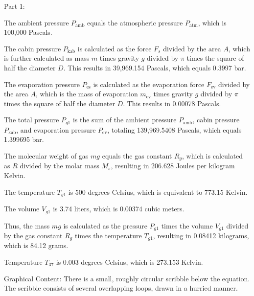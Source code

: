 Part 1:

The ambient pressure \( P_{\text{amb}} \) equals the atmospheric pressure \( P_{\text{atm}} \), which is 100,000 Pascals.

The cabin pressure \( P_{\text{kab}} \) is calculated as the force \( F_s \) divided by the area \( A \), which is further calculated as mass \( m \) times gravity \( g \) divided by \( \pi \) times the square of half the diameter \( D \). This results in 39,969.154 Pascals, which equals 0.3997 bar.

The evaporation pressure \( P_{\text{es}} \) is calculated as the evaporation force \( F_{\text{ev}} \) divided by the area \( A \), which is the mass of evaporation \( m_{\text{ev}} \) times gravity \( g \) divided by \( \pi \) times the square of half the diameter \( D \). This results in 0.00078 Pascals.

The total pressure \( P_{g1} \) is the sum of the ambient pressure \( P_{\text{amb}} \), cabin pressure \( P_{\text{kab}} \), and evaporation pressure \( P_{\text{ev}} \), totaling 139,969.5408 Pascals, which equals 1.399695 bar.

The molecular weight of gas \( mg \) equals the gas constant \( R_g \), which is calculated as \( R \) divided by the molar mass \( M_s \), resulting in 206.628 Joules per kilogram Kelvin.

The temperature \( T_{g1} \) is 500 degrees Celsius, which is equivalent to 773.15 Kelvin.

The volume \( V_{g1} \) is 3.74 liters, which is 0.00374 cubic meters.

Thus, the mass \( mg \) is calculated as the pressure \( P_{g1} \) times the volume \( V_{g1} \) divided by the gas constant \( R_g \) times the temperature \( T_{g1} \), resulting in 0.08412 kilograms, which is 84.12 grams.

Temperature \( T_{37} \) is 0.003 degrees Celsius, which is 273.153 Kelvin.

Graphical Content: There is a small, roughly circular scribble below the equation. The scribble consists of several overlapping loops, drawn in a hurried manner.